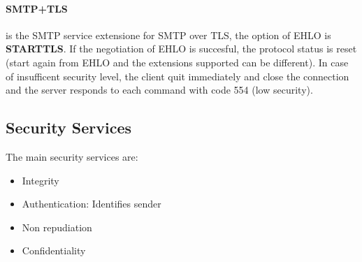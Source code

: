 \documentclass[12pt]{article}
\begin{document}
\paragraph{SMTP+TLS} is the SMTP service extensione for SMTP over TLS, the option of EHLO is \textbf{STARTTLS}. If the negotiation of EHLO is succesful, the protocol status is reset (start again from EHLO and the extensions supported can be different). In case of insufficent security level, the client quit immediately and close the connection and the server responds to each command with code 554 (low security).

\subsection{Security Services}
The main security services are:
\begin{itemize}
  \item Integrity
  \item Authentication: Identifies sender
  \item Non repudiation
  \item Confidentiality
\end{itemize}
\end{document}
